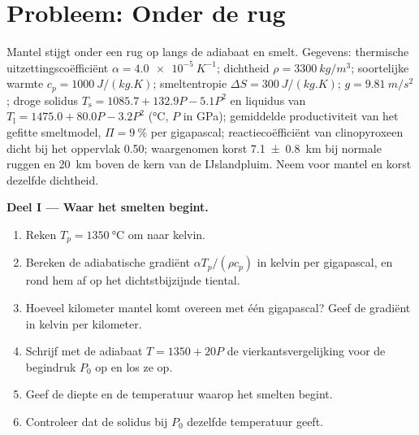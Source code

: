 \section{Probleem: Onder de rug}

\begin{problem}
\label{pb:b2:mantle-melting:1}
Mantel stijgt onder een rug op langs de adiabaat en smelt. Gegevens: thermische
uitzettingscoëfficiënt $\alpha = \qty{4.0e-5}{K^{-1}}$; dichtheid $\rho = \qty{3300}{kg/m^3}$;
soortelijke warmte $c_p = \qty{1000}{J/(kg.K)}$; smeltentropie $\Delta S =
\qty{300}{J/(kg.K)}$; $g = \qty{9.81}{m/s^2}$; droge solidus $T_{\mathrm s} =
1085.7 + 132.9P - 5.1P^2$ en liquidus van  $T_{\mathrm l} = 1475.0 +
80.0P - 3.2P^2$ (\unit{\celsius}, $P$ in \unit{GPa}); gemiddelde productiviteit van het
gefitte smeltmodel, $\Pi = \qty{9}{\percent}$ per gigapascal; reactiecoëfficiënt van
clinopyroxeen dicht bij het oppervlak 0.50; waargenomen korst \qty[uncertainty-mode=separate]{7.1 \pm 0.8}{km}
bij normale ruggen en \qty{20}{km} boven de kern van de IJslandpluim. Neem voor mantel
en korst dezelfde dichtheid.

\noindent\textbf{Deel I --- Waar het smelten begint.}
\begin{enumerate}
\item Reken $T_p = \qty{1350}{\celsius}$ om naar kelvin.
\item Bereken de adiabatische gradiënt $\alpha T_p/(\rho c_p)$ in kelvin per
gigapascal, en rond hem af op het dichtstbijzijnde tiental.
\item Hoeveel kilometer mantel komt overeen met één gigapascal? Geef de gradiënt in
kelvin per kilometer.
\item Schrijf met de adiabaat $T = 1350 + 20P$ de vierkantsvergelijking voor de begindruk
$P_0$ op en los ze op.
\item Geef de diepte en de temperatuur waarop het smelten begint.
\item Controleer dat de solidus bij $P_0$ dezelfde temperatuur geeft.
\end{enumerate}


\end{problem}
